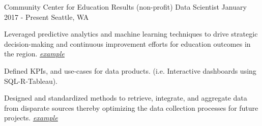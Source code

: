 
\begin{cventries}
	\cventry
		{Community Center for Education Results (non-profit)}
    	{Data Scientist}
    	{January 2017 - Present}
    	{Seattle, WA}
    	{
      		\begin{cvitems} 
      			\item {Leveraged predictive analytics and machine learning techniques to drive strategic decision-making and continuous improvement efforts for education outcomes in the region. \href{https://docs.google.com/presentation/d/1hXTSttTE6oddJywVadC25Lxk6259VEPO2anXnqbrSZ4/edit?usp=sharing}{\underline{\textit{example}}}}
      			\item {Defined KPIs, and use-cases for data products. (i.e. Interactive dashboards using SQL-R-Tableau).}
      			\item {Designed and standardized methods to retrieve, integrate, and aggregate data from disparate sources thereby optimizing the data collection processes for future projects. \href{https://github.com/CCER-RMP/S275_ETL}{\underline{\textit{example}}}}
      		\end{cvitems} 
    	}


\end{cventries}
